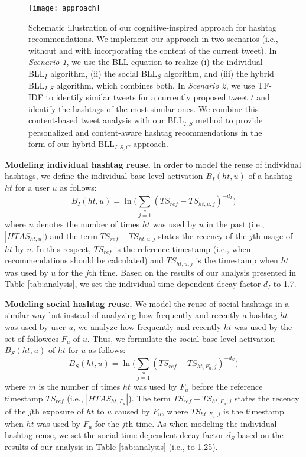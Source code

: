 \documentclass{sig-alternate-05-2015}
\begin{document}
\begin{figure}[t!]
   \centering
      \texttt{[image: approach]} 
   \caption{Schematic illustration of our cognitive-inspired approach for hashtag recommendations. We implement our approach in two scenarios (i.e., without and with incorporating the content of the current tweet). In \textit{Scenario 1}{}, we use the BLL equation to realize (i) the individual BLL$_I$ algorithm, (ii) the social BLL$_S$ algorithm, and (iii) the hybrid BLL$_{I,S}${} algorithm, which combines both. In \textit{Scenario 2}{}, we use TF-IDF to identify similar tweets for a currently proposed tweet $t$ and identify the hashtags of the most similar ones. We combine this content-based tweet analysis with our BLL$_{I,S}${} method to provide personalized and content-aware hashtag recommendations in the form of our hybrid BLL$_{I,S,C}${} approach.
\vspace{-3mm}}
	 \label{fig:approach}
\end{figure}

\vspace{2mm} \noindent \textbf{Modeling individual hashtag reuse.}
In order to model the reuse of individual hashtags, we define the individual base-level activation $B_I(ht, u)$ of a hashtag $ht$ for a user $u$ as follows:
\begin{equation}
	B_I(ht, u) = \ln(\sum\limits_{j = 1}\limits^{n}{(TS_{ref} - TS_{ht,u,j})^{-d_I})}
\end{equation}
where $n$ denotes the number of times $ht$ was used by $u$ in the past (i.e., $|HTAS_{ht,u}|$) and the term $TS_{ref} - TS_{ht,u,j}$ states the recency of the $j$th usage of $ht$ by $u$. In this respect, $TS_{ref}$ is the reference timestamp (i.e., when recommendations should be calculated) and $TS_{ht,u,j}$ is the timestamp when $ht$ was used by $u$ for the $j$th time. Based on the results of our analysis presented in Table \ref{tab:analysis}, we set the individual time-dependent decay factor $d_I$ to 1.7.

\vspace{2mm} \noindent \textbf{Modeling social hashtag reuse.}
We model the reuse of social hashtags in a similar way but instead of analyzing how frequently and recently a hashtag $ht$ was used by user $u$, we analyze how frequently and recently $ht$ was used by the set of followees $F_u$ of $u$. Thus, we formulate the social base-level activation $B_S(ht, u)$ of $ht$ for $u$ as follows:
\begin{equation}
	B_S(ht, u) = \ln(\sum\limits_{j = 1}\limits^{m}{(TS_{ref} - TS_{ht,F_u,j})^{-d_S})}
\end{equation}
where $m$ is the number of times $ht$ was used by $F_u$ before the reference timestamp $TS_{ref}$ (i.e., $|HTAS_{ht,F_u}|$). The term $TS_{ref} - TS_{ht,F_u,j}$ states the recency of the $j$th exposure of $ht$ to $u$ caused by $F_u$, where $TS_{ht,F_u,j}$ is the timestamp when $ht$ was used by $F_u$ for the $j$th time. As when modeling the individual hashtag reuse, we set the social time-dependent decay factor $d_S$ based on the results of our analysis in Table \ref{tab:analysis} (i.e., to 1.25).
\end{document}
